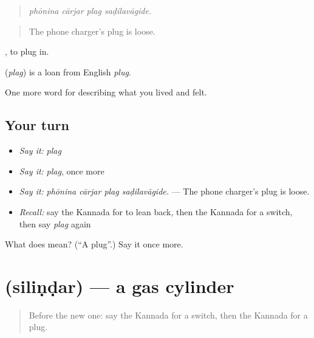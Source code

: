 \begin{quote}
\emph{phōnina cārjar plag saḍilavāgide.}
\end{quote}

\begin{quote}
The phone charger's plug is loose.
\end{quote}

 , to plug in.

\begin{cousinweb}
\textbf{} (\emph{plag}) is a loan from English \emph{plug}.
\end{cousinweb}

\begin{grammarlens}[title={What you've built}]
One more word for describing what you lived and felt.
\end{grammarlens}

\subsection*{Your turn}
\begin{itemize}
\raggedright
  \item \emph{Say it:} \emph{plag}
  \item \emph{Say it:} \emph{plag}, once more
  \item \emph{Say it:} \emph{phōnina cārjar plag saḍilavāgide.} — The phone charger's plug is loose.
  \item \emph{Recall:} say the Kannada for to lean back, then the Kannada for a switch, then say \emph{plag} again
\end{itemize}

\begin{tcolorbox}[breakable,colback=teal!4,colframe=teal!35!black,title={Before you move on}]
What does  mean? (\textquotedblleft{}A plug\textquotedblright{}.) Say it once more.
\end{tcolorbox}
\section[\texorpdfstring{\kn{ಸಿಲಿಂಡರ್} (siliṇḍar)}{ಸಿಲಿಂಡರ್ (siliṇḍar)}]{ (siliṇḍar) — a gas cylinder}

\label{lesson:KA-C544-silindar}



\begin{quote}
Before the new one: say the Kannada for a switch, then the Kannada for a plug.
\end{quote}

